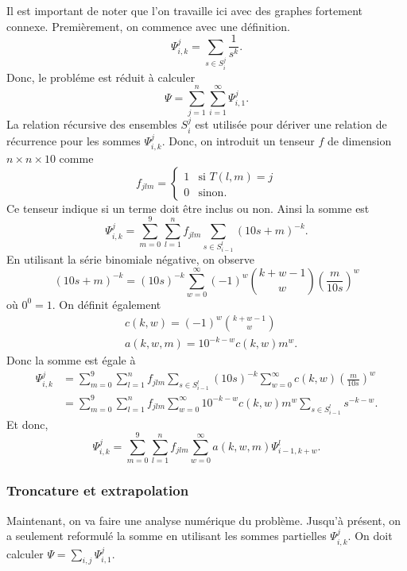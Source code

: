 Il est important de noter que l'on travaille ici avec des graphes fortement connexe.
Premi\`erement, on commence avec une d\'efinition.
\[
	\Psi_{i,k}^{j} = \sum_{s\in S_{i}^{j}} \frac{1}{s^{k}}.
\]
Donc, le probl\'eme est r\'eduit \`a calculer
\[
	\Psi = \sum_{j=1}^{n}\sum_{i=1}^{\infty}\Psi_{i, 1}^{j}.
\]
La relation r\'ecursive des ensembles $S_{i}^{j}$ est utilis\'ee pour d\'eriver
une relation de r\'ecurrence pour les sommes $\Psi_{i,k}^{j}$. Donc, on introduit
un tenseur $f$ de dimension $n\times n\times10$ comme
\[
	f_{jlm} = 
	\begin{cases}
		1 & \text{si }  T(l,m) = j \\
		0 & \text{sinon}.
	\end{cases}
\]
Ce tenseur indique si un terme doit \^etre inclus ou non. Ainsi la somme est
\[
	\Psi_{i,k}^{j} = \sum_{m=0}^{9}\sum_{l=1}^{n} f_{jlm} \sum_{s\in
	S_{i-1}^{l}} (10s+m)^{-k}.
\]
En utilisant la s\'erie binomiale n\'egative, on observe
\[
	(10s+m)^{-k} =
	(10s)^{-k}\sum_{w=0}^{\infty}(-1)^{w}\binom{k+w-1}{w}\left( \frac{m}{10s} \right)^{w}
\]
o\`u $0^{0}=1$. On d\'efinit \'egalement
\[
	\begin{split}
		&c(k, w) = (-1)^{w}\binom{k+w-1}{w}\\
		&a(k, w, m) = 10^{-k-w}c(k, w)m^{w}.
	\end{split}
\]
Donc la somme est \'egale \`a
\begin{equation*}
	\begin{split}
		\Psi_{i,k}^{j} &= \sum_{m=0}^{9}\sum_{l=1}^{n}f_{jlm} \sum_{s\in S_{i-1}^{l}} (10s)^{-k} \sum_{w=0}^{\infty} c(k,w) \left(\frac{m}{10s}\right)^{w}\\
					   &= \sum_{m=0}^{9}\sum_{l=1}^{n}f_{jlm} \sum_{w=0}^{\infty} 10^{-k-w} c(k, w)m^{w} \sum_{s\in S_{i-1}^{l}} s^{-k-w}.
	\end{split}
\end{equation*}
Et donc,
\begin{equation}
	\Psi_{i, k}^{j} = \sum_{m=0}^{9}\sum_{l=1}^{n}f_{jlm} \sum_{w=0}^{\infty} a(k,w,m)\Psi_{i-1, k+w}^{l}.
	\label{eq:partial}
\end{equation}
\subsubsection{Troncature et extrapolation}
Maintenant, on va faire une analyse num\'erique du probl\`eme. Jusqu'\`a
pr\'esent, on a seulement reformul\'e la somme en utilisant les sommes
partielles $\Psi_{i,k}^{j}$. On doit calculer $\Psi = \sum_{i,j}
\Psi_{i,1}^{j}$.


